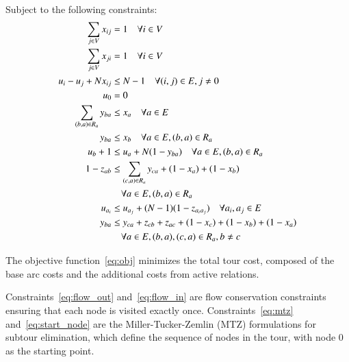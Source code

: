 \documentclass[twocolumn, switch]{article} %
\begin{document}
Subject to the following constraints:
\begin{subequations}
\begin{align}
    \sum_{j \in V} x_{ij} &= 1 \quad \forall i \in V \label{eq:flow_out} \\
    \sum_{j \in V} x_{ji} &= 1 \quad \forall i \in V \label{eq:flow_in} \\
    u_i - u_j + N x_{ij} &\leq N-1 \quad \forall (i,j) \in E, j \neq 0 \label{eq:mtz} \\
    u_0 &= 0 \label{eq:start_node} \\
    \sum_{(b,a) \in R_a} y_{ba} &\leq x_a \quad \forall a \in E \label{eq:rel_active_1} \\
    y_{ba} &\leq x_b \quad \forall a \in E, (b,a) \in R_a \label{eq:rel_active_2} \\
    u_b + 1 &\leq u_a + N(1-y_{ba}) \quad \forall a \in E, (b,a) \in R_a \label{eq:rel_precedence} \\
    1 - z_{ab} &\leq \sum_{(c,a) \in R_a} y_{ca} + (1 - x_a) + (1 - x_b) \notag \\
    &\quad \forall a \in E, (b,a) \in R_a \label{eq:rel_active_3} \\
    u_{a_i} &\leq u_{a_j} + (N-1)(1-z_{a_ia_j}) \quad \forall a_i, a_j \in E \label{eq:z_precedence} \\
    y_{ba} &\leq y_{ca} + z_{cb} + z_{ac} + (1-x_c) + (1-x_b) + (1-x_a) \notag \\
    &\quad \forall a \in E, (b,a),(c,a) \in R_a, b \neq c \label{eq:rel_last_trigger}
\end{align}
\end{subequations}

\normalsize

The objective function~\eqref{eq:obj} minimizes the total tour cost, composed of the base arc costs and the additional costs from active relations.

Constraints~\eqref{eq:flow_out} and~\eqref{eq:flow_in} are flow conservation constraints ensuring that each node is visited exactly once.
Constraints~\eqref{eq:mtz} and~\eqref{eq:start_node} are the Miller-Tucker-Zemlin (MTZ) formulations for subtour elimination, which define the sequence of nodes in the tour, with node 0 as the starting point.
\end{document}

